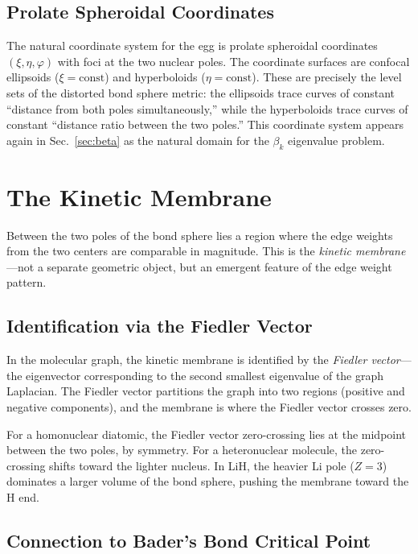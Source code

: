 \documentclass[aps,pra,twocolumn,superscriptaddress,longbibliography]{revtex4-2}
\begin{document}
\subsection{Prolate Spheroidal Coordinates}

The natural coordinate system for the egg is prolate spheroidal
coordinates $(\xi, \eta, \varphi)$ with foci at the two nuclear poles.
The coordinate surfaces are confocal ellipsoids ($\xi = \text{const}$)
and hyperboloids ($\eta = \text{const}$).  These are precisely the
level sets of the distorted bond sphere metric: the ellipsoids trace
curves of constant ``distance from both poles simultaneously,'' while
the hyperboloids trace curves of constant ``distance ratio between
the two poles.''  This coordinate system appears again in
Sec.~\ref{sec:beta} as the natural domain for the $\beta_k$ eigenvalue
problem.


\section{The Kinetic Membrane}
\label{sec:membrane}

Between the two poles of the bond sphere lies a region where the edge
weights from the two centers are comparable in magnitude.  This is the
\emph{kinetic membrane}---not a separate geometric object, but an
emergent feature of the edge weight pattern.

\subsection{Identification via the Fiedler Vector}

In the molecular graph, the kinetic membrane is identified by the
\emph{Fiedler vector}---the eigenvector corresponding to the second
smallest eigenvalue of the graph Laplacian.  The Fiedler vector
partitions the graph into two regions (positive and negative components),
and the membrane is where the Fiedler vector crosses zero.

For a homonuclear diatomic, the Fiedler vector zero-crossing lies at
the midpoint between the two poles, by symmetry.  For a heteronuclear
molecule, the zero-crossing shifts toward the lighter nucleus.  In LiH,
the heavier Li pole ($Z = 3$) dominates a larger volume of the bond
sphere, pushing the membrane toward the H end.

\subsection{Connection to Bader's Bond Critical Point}
\end{document}
